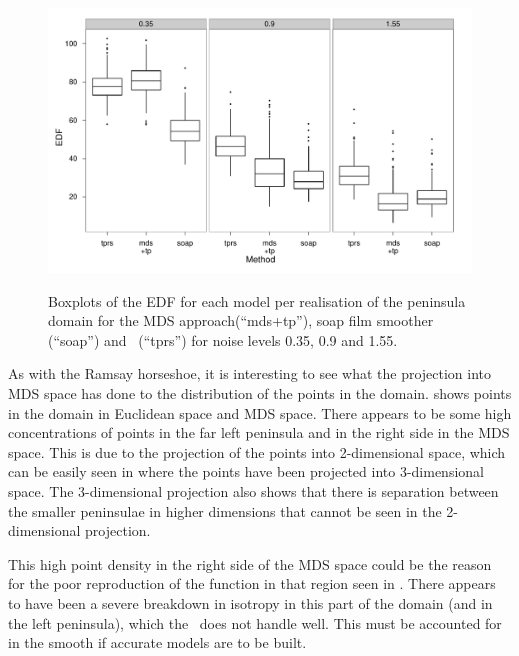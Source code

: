 \begin{figure}
\centering
\includegraphics[width=\textwidth]{mds/figs/mds-wt2-boxplot-edf.pdf} \\
\caption{Boxplots of the EDF for each model per realisation of the peninsula domain for the MDS approach(``mds+tp''), soap film smoother (``soap'') and \tprs\ (``tprs'') for noise levels 0.35, 0.9 and 1.55.}
\label{mds-wt2-boxplot-edf}
\end{figure}

As with the Ramsay horseshoe, it is interesting to see what the projection into MDS space has done to the distribution of the points in the domain.  shows points in the domain in Euclidean space and MDS space. There appears to be some high concentrations of points in the far left peninsula and in the right side in the MDS space. This is due to the projection of the points into 2-dimensional space, which can be easily seen in  where the points have been projected into 3-dimensional space. The 3-dimensional projection also shows that there is separation between the smaller peninsulae in higher dimensions that cannot be seen in the 2-dimensional projection.

This high point density in the right side of the MDS space could be the reason for the poor reproduction of the function in that region seen in . There appears to have been a severe\label{cor-r37} breakdown in isotropy in this part of the domain (and in the left peninsula), which the \tprs\ does not handle well. This must be accounted for in the smooth if accurate models are to be built.

